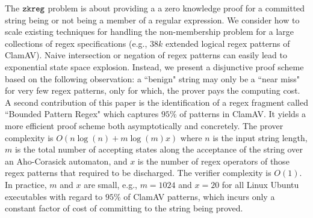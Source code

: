 The ${\tt zkreg }$ problem is about providing a a zero knowledge proof for
a committed string being or not being a member of 
a regular expression.
We consider how to scale existing techniques for handling 
the non-membership problem for a
large collections of regex specifications (e.g., $38k$ extended logical regex
patterns of ClamAV). Naive intersection or negation of regex patterns
can easily lead to exponential state space explosion.
Instead, we present a disjunctive proof scheme based on the
following observation: a ``benign" string may only be a ``near miss" for
very few regex patterns, only for which, the prover pays the computing
cost.  A second contribution
of this paper is the identification of a regex fragment called
``Bounded Pattern Regex" which captures $95\%$ of patterns
in ClamAV. It yields a more efficient proof scheme both
asymptotically and concretely. 
The prover complexity
is $O(n\log(n) + m\log(m) x)$ where
$n$ is the input string length, $m$ is the total number of
accepting states along the acceptance of the string
over an Aho-Corasick automaton,
and $x$ is the number of regex operators of those regex patterns
that required to be discharged.
The verifier complexity is $O(1)$. In practice,
$m$ and $x$ are small, e.g., $m=1024$ and $x=20$ for all Linux Ubuntu
executables with regard to $95\%$ of ClamAV patterns,
which incurs only a constant factor of cost of
committing to the string being proved.
